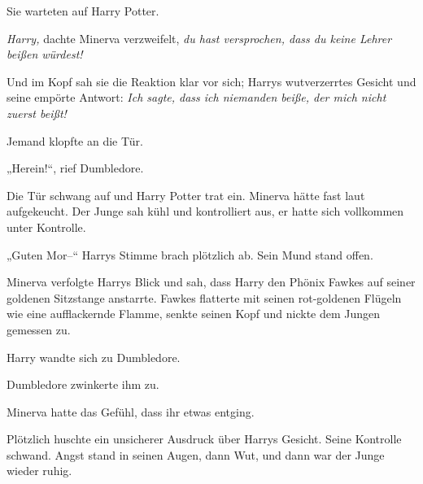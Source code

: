 Sie warteten auf Harry Potter.

\emph{Harry,} dachte Minerva verzweifelt, \emph{du hast versprochen, dass du keine Lehrer beißen würdest!}

Und im Kopf sah sie die Reaktion klar vor sich; Harrys wutverzerrtes Gesicht und seine empörte Antwort: \emph{Ich sagte, dass ich niemanden beiße, der mich nicht zuerst beißt!}

Jemand klopfte an die Tür.

„Herein!“, rief Dumbledore.

Die Tür schwang auf und Harry Potter trat ein. Minerva hätte fast laut aufgekeucht. Der Junge sah kühl und kontrolliert aus, er hatte sich vollkommen unter Kontrolle.

„Guten Mor–“ Harrys Stimme brach plötzlich ab. Sein Mund stand offen.

Minerva verfolgte Harrys Blick und sah, dass Harry den Phönix Fawkes auf seiner goldenen Sitzstange anstarrte. Fawkes flatterte mit seinen rot-goldenen Flügeln wie eine aufflackernde Flamme, senkte seinen Kopf und nickte dem Jungen gemessen zu.

Harry wandte sich zu Dumbledore.

Dumbledore zwinkerte ihm zu.

Minerva hatte das Gefühl, dass ihr etwas entging.

Plötzlich huschte ein unsicherer Ausdruck über Harrys Gesicht. Seine Kontrolle schwand. Angst stand in seinen Augen, dann Wut, und dann war der Junge wieder ruhig.

